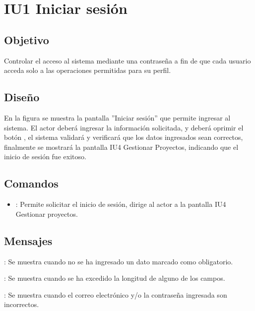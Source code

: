 \section{IU1 Iniciar sesión}

\subsection{Objetivo}
	Controlar el acceso al sistema mediante una contraseña a fin de que cada usuario acceda solo a las operaciones permitidas para su perfil.

\subsection{Diseño}
	En la figura  se muestra la pantalla ''Iniciar sesión'' que permite ingresar al sistema. El actor deberá ingresar la información solicitada, y deberá oprimir el botón , el sistema validará y verificará que los datos ingresados sean correctos, finalmente se mostrará la pantalla IU4 Gestionar Proyectos, indicando que el inicio de sesión fue exitoso.

\subsection{Comandos}
\begin{itemize}
	\item {}: Permite solicitar el inicio de sesión, dirige al actor a la pantalla IU4 Gestionar proyectos.
\end{itemize}

\subsection{Mensajes}

\begin{Citemize}
	\item {}: Se muestra cuando no se ha ingresado un dato marcado como obligatorio.
	\item {}: Se muestra cuando se ha excedido la longitud de alguno de los campos.
	\item {}: Se muestra cuando el correo electrónico y/o la contraseña ingresada son incorrectos.
\end{Citemize}


